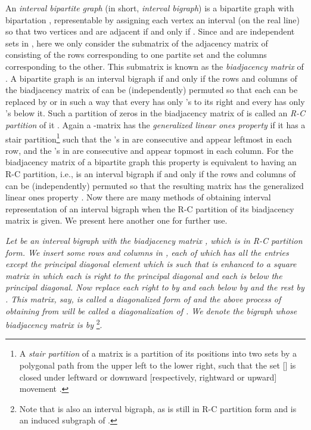\documentclass[secthm]{elsart}
\begin{document}
\vspace{-1.25em} An {\em{interval bipartite graph}} (in short, {\em interval bigraph}) is a bipartite graph  with bipartation , representable by assigning each vertex  an interval  (on the real line) so that two vertices  and  are adjacent if and only if  \cite{HKM}. Since  and  are independent sets in , here we only consider the submatrix of the adjacency matrix of  consisting of the rows corresponding to one partite set and the columns corresponding to the other. This submatrix is known as the {\em{biadjacency matrix}} of . A bipartite graph  is an interval bigraph if and only if the rows and columns of the biadjacency matrix of  can be (independently) permuted so that each  can be replaced by  or  in such a way that every  has only 's to its right and every  has only 's below it. Such a partition of zeros in the biadjacency matrix of  is called an {\em{R-C partition}} of it \cite{SDRW}. Again a -matrix  has the {\em generalized linear ones property} if it has a stair partition\footnote{A {\em stair partition} of a matrix is a partition of its positions into two sets  by a polygonal path from the upper left to the lower right, such that the set  [] is closed under leftward or downward [respectively, rightward or upward] movement \cite{SDW}.}  such that the 's in  are consecutive and appear leftmost in each row, and the 's in  are consecutive and appear topmost in each column. For the biadjacency matrix  of a bipartite graph  this property is equivalent to having an R-C partition, i.e.,  is an interval bigraph if and only if the rows and columns of  can be (independently) permuted so that the resulting matrix has the generalized linear ones property \cite{SDW}. Now there are many methods \cite{Mu,SDRW,W} of obtaining interval representation of an interval bigraph when the R-C partition of its biadjacency matrix is given. We present here another one for further use. 

\begin{defn}
{\em Let  be an interval bigraph with the biadjacency matrix , which is in R-C partition form. We insert some rows and columns in , each of which has all the entries  except the principal diagonal element which is  such that  is enhanced to a square matrix in which each  is right to the principal diagonal and each  is below the principal diagonal. Now replace each  right to  by  and each  below  by  and the rest by . This matrix, say,  is called a {\em diagonalized} form of  and the above process of obtaining  from  will be called a {\em{diagonalization}} of . We denote the bigraph whose biadjacency matrix is  by }\footnote{Note that  is also an interval bigraph, as  is still in R-C partition form and  is an induced subgraph of .}.
\end{defn}
\end{document}
